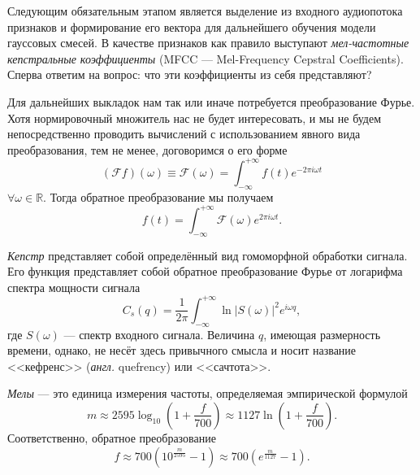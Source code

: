 \documentclass[12pt]{gost-7-32}
\begin{document}
Следующим обязательным этапом является выделение из входного аудиопотока признаков и формирование его вектора для дальнейшего обучения модели гауссовых смесей.
В качестве признаков как правило \cite{vr_ml, gr_unc_env} выступают \textit{мел-частотные кепстральные коэффициенты} (MFCC --- Mel-Frequency Cepstral Coefficients).
Сперва ответим на вопрос: что эти коэффициенты из себя представляют?

Для дальнейших выкладок нам так или иначе потребуется преобразование Фурье.
Хотя нормировочный множитель нас не будет интересовать, и мы не будем непосредственно проводить вычислений с использованием явного вида преобразования, тем не менее, договоримся о его форме
\begin{equation}
    (\mathcal{F} f)(\omega) \equiv \mathcal{F}(\omega) = \int_{-\infty}^{+\infty} f(t) e^{-2 \pi i \omega t}
\end{equation}
$\forall \omega \in \mathbb{R}$. Тогда обратное преобразование мы получаем
\begin{equation}
    f(t) = \int_{-\infty}^{+\infty} \mathcal{F}(\omega) e^{2 \pi i \omega t}.
\end{equation}

\textit{Кепстр} представляет собой определённый вид гомоморфной обработки сигнала.
Его функция представляет собой обратное преобразование Фурье от логарифма спектра мощности сигнала
\begin{equation}
    C_s(q) = \frac{1}{2 \pi} \int_{-\infty}^{+\infty} \ln |S(\omega)|^2 e^{i \omega q},
\end{equation}
где $S(\omega)$ --- спектр входного сигнала.
Величина $q$, имеющая размерность времени, однако, не несёт здесь привычного смысла и носит название <<кефренс>> (\textit{англ.} quefrency) или <<сачтота>>.

\textit{Мелы} --- это единица измерения частоты, определяемая эмпирической формулой
\begin{equation}\label{eq:ftom}
    m \approx 2595 \log_{10} \left( 1 + \frac{f}{700} \right) \approx 1127 \ln \left( 1 + \frac{f}{700} \right).
\end{equation}
Соответственно, обратное преобразование
\begin{equation}
    f \approx 700 \left( 10^{\frac{m}{2595}} - 1 \right) \approx 700 \left( e^{\frac{m}{1127}} - 1 \right).
\end{equation}
\end{document}
